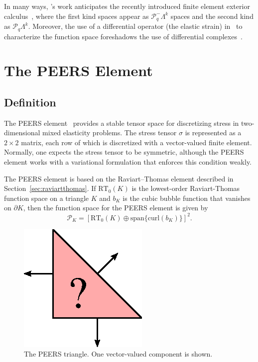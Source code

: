In many ways, \nedelec{}'s work anticipates the recently introduced
finite element exterior calculus~\cite{ArnoldFalkEtAl2006}, where the
first kind spaces appear as \( \mathcal{P}_q^-\Lambda^k \) spaces and
the second kind as \(
\mathcal{P}_q\Lambda^k \). Moreover, the use of a differential
operator (the elastic strain) in~\cite{Nedelec1980} to characterize
the function space foreshadows the use of differential
complexes~\cite{ArnoldFalkEtAl2006a}.


\newpage

\section{The PEERS Element}

\subsection{Definition}

The PEERS element~\cite{ArnoldBrezziEtAl1984} provides a stable tensor
space for discretizing stress in two-dimensional mixed elasticity
problems. The stress tensor \( \sigma \) is represented as a \( 2
\times 2 \) matrix, each row of which is discretized with a
vector-valued finite element.  Normally, one expects the stress tensor
to be symmetric, although the PEERS element works with a variational
formulation that enforces this condition weakly.

The PEERS element is based on the Raviart--Thomas element described in
Section~\ref{sec:raviartthomas}.  If \( \mathrm{RT}_0(K) \) is the
lowest-order Raviart-Thomas function space on a triangle \( K \) and
\( b_K \) is the cubic bubble function that vanishes on \( \partial K
\), then the function space for the PEERS element is given by
\begin{displaymath}
\mathcal{P}_K = \left[\mathrm{RT}_0(K) \oplus \mathrm{span}\{\mathrm{curl}( b_K )\} \right]^2.
\end{displaymath}

\begin{figure}[H]
  \begin{center}
    \includegraphics[width=\smallwidth]{chapters/kirby-6/eps/PEERS.eps}
    \caption{The PEERS triangle. One vector-valued component is shown.}
  \end{center}
\end{figure}


